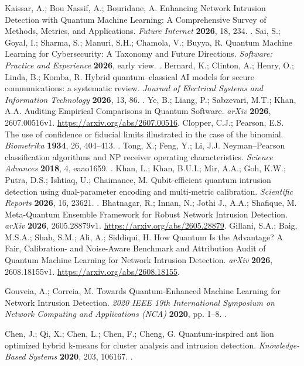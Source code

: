  Kaissar, A.; Bou Nassif, A.; Bouridane, A. Enhancing Network Intrusion Detection with Quantum Machine Learning: A Comprehensive Survey of Methods, Metrics, and Applications. \emph{Future Internet} \textbf{2026}, 18, 234. .
 Sai, S.; Goyal, I.; Sharma, S.; Manuri, S.H.; Chamola, V.; Buyya, R. Quantum Machine Learning for Cybersecurity: A Taxonomy and Future Directions. \emph{Software: Practice and Experience} \textbf{2026}, early view. .
 Bernard, K.; Clinton, A.; Henry, O.; Linda, B.; Komba, R. Hybrid quantum--classical AI models for secure communications: a systematic review. \emph{Journal of Electrical Systems and Information Technology} \textbf{2026}, 13, 86. .
 Ye, B.; Liang, P.; Sabzevari, M.T.; Khan, A.A. Auditing Empirical Comparisons in Quantum Software. \emph{arXiv} \textbf{2026}, 2607.00516v1. \url{https://arxiv.org/abs/2607.00516}.
 Clopper, C.J.; Pearson, E.S. The use of confidence or fiducial limits illustrated in the case of the binomial. \emph{Biometrika} \textbf{1934}, 26, 404--413. .
 Tong, X.; Feng, Y.; Li, J.J. Neyman--Pearson classification algorithms and NP receiver operating characteristics. \emph{Science Advances} \textbf{2018}, 4, eaao1659. .
 Khan, L.; Khan, B.U.I.; Mir, A.A.; Goh, K.W.; Putra, D.S.; Ishtiaq, U.; Chaimanee, M. Qubit-efficient quantum intrusion detection using dual-parameter encoding and multi-metric calibration. \emph{Scientific Reports} \textbf{2026}, 16, 23621. .
 Bhatnagar, R.; Innan, N.; Jothi J., A.A.; Shafique, M. Meta-Quantum Ensemble Framework for Robust Network Intrusion Detection. \emph{arXiv} \textbf{2026}, 2605.28879v1. \url{https://arxiv.org/abs/2605.28879}.
 Gillani, S.A.; Baig, M.S.A.; Shah, S.M.; Ali, A.; Siddiqui, H. How Quantum Is the Advantage? A Fair, Calibration- and Noise-Aware Benchmark and Attribution Audit of Quantum Machine Learning for Network Intrusion Detection. \emph{arXiv} \textbf{2026}, 2608.18155v1. \url{https://arxiv.org/abs/2608.18155}.


 Gouveia, A.; Correia, M. Towards Quantum-Enhanced Machine Learning for Network Intrusion Detection. \emph{2020 IEEE 19th International Symposium on Network Computing and Applications (NCA)} \textbf{2020}, pp. 1--8. .

 Chen, J.; Qi, X.; Chen, L.; Chen, F.; Cheng, G. Quantum-inspired ant lion optimized hybrid k-means for cluster analysis and intrusion detection. \emph{Knowledge-Based Systems} \textbf{2020}, 203, 106167. .

